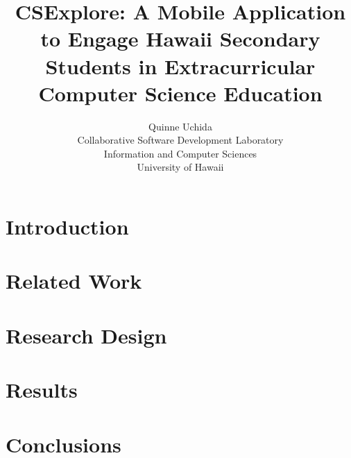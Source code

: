 \documentclass[english]{proposalnsf}
\title {CSExplore: A Mobile Application to Engage Hawaii Secondary Students in Extracurricular Computer Science Education}
\author{Quinne Uchida\\Collaborative Software Development Laboratory \\ Information and Computer Sciences \\ University of Hawaii}
\begin{document}
\maketitle
\tableofcontents
\newpage

\section{Introduction}
\label{introduction}


\section{Related Work}
\label{related-work}
\section{Research Design}
\label{research-design}

\section{Results}
\label{results}



\section{Conclusions}
\label{conclusions}





\appendix
\end{document}
